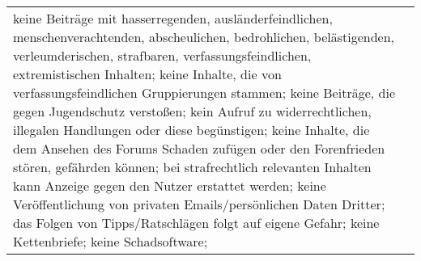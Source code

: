\begin{landscape}
\begin{longtable}{lp{170mm}}
	keine Beiträge mit hasserregenden, ausländerfeindlichen, menschenverachtenden, 
	abscheulichen, bedrohlichen, belästigenden, verleumderischen, strafbaren, 
	verfassungsfeindlichen, extremistischen Inhalten; keine Inhalte, die von 
	verfassungsfeindlichen Gruppierungen stammen; keine Beiträge, die gegen 
	Jugendschutz verstoßen; kein Aufruf zu widerrechtlichen, illegalen Handlungen oder diese begünstigen;
	keine Inhalte, die dem Ansehen des Forums Schaden zufügen oder den Forenfrieden stören, gefährden können;
	bei strafrechtlich relevanten Inhalten kann Anzeige gegen den Nutzer erstattet werden;  
	keine Veröffentlichung von privaten Emails/persönlichen 
	Daten Dritter; das Folgen von Tipps/Ratschlägen folgt auf eigene Gefahr; keine Kettenbriefe; keine 
	Schadsoftware; 

\end{longtable}
\end{landscape}
